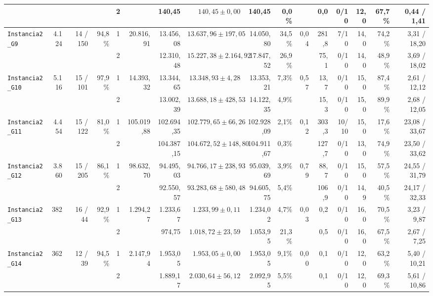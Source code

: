 {\begin{longtable}{lrrrcrrrrrrrrrrr}
& & & & 2 &  & 140,45 & $140,45 \pm 0,00$ & 140,45 & 0,0\% &  & 0,0 & 0/10 & 12,0 & 67,7\% & 0,44 / 1,41 \\
\midrule
\multirow{2}{*}{\texttt{Instancia2\_G9}} & \multirow{2}{*}{4.124} & \multirow{2}{*}{14 / 150} & \multirow{2}{*}{94,8\%} & 1 & \multirow{2}{*}{20.816,91} & 13.456,08 & $13.637,96 \pm 197,05$ & 14.050,80 & 34,5\% & \multirow{2}{*}{0,04} & 281,8 & 7/10 & 14,0 & 74,2\% & 3,31 / 18,20 \\
& & & & 2 &  & 12.310,48 & $15.227,38 \pm 2.164,92$ & 17.847,52 & 26,9\% &  & 75,1 & 0/10 & 14,0 & 48,9\% & 3,69 / 18,02 \\
\midrule
\multirow{2}{*}{\texttt{Instancia2\_G10}} & \multirow{2}{*}{5.116} & \multirow{2}{*}{15 / 101} & \multirow{2}{*}{97,9\%} & 1 & \multirow{2}{*}{14.393,32} & 13.344,65 & $13.348,93 \pm 4,28$ & 13.353,21 & 7,3\% & \multirow{2}{*}{0,57} & 13,7 & 0/10 & 15,0 & 87,4\% & 2,61 / 12,12 \\
& & & & 2 &  & 13.002,39 & $13.688,18 \pm 428,53$ & 14.122,35 & 4,9\% &  & 15,3 & 0/10 & 15,0 & 89,9\% & 2,68 / 12,05 \\
\midrule
\multirow{2}{*}{\texttt{Instancia2\_G11}} & \multirow{2}{*}{4.454} & \multirow{2}{*}{15 / 122} & \multirow{2}{*}{81,0\%} & 1 & \multirow{2}{*}{105.019,88} & 102.694,35 & $102.779,65 \pm 66,26$ & 102.928,09 & 2,1\% & \multirow{2}{*}{0,12} & 303,3 & 10/10 & 15,0 & 17,6\% & 23,08 / 33,67 \\
& & & & 2 &  & 104.387,15 & $104.672,52 \pm 148,80$ & 104.911,67 & 0,3\% &  & 127,7 & 0/10 & 13,0 & 74,9\% & 23,50 / 33,62 \\
\midrule
\multirow{2}{*}{\texttt{Instancia2\_G12}} & \multirow{2}{*}{3.860} & \multirow{2}{*}{15 / 205} & \multirow{2}{*}{86,1\%} & 1 & \multirow{2}{*}{98.632,70} & 94.495,03 & $94.766,17 \pm 238,93$ & 95.039,69 & 3,9\% & \multirow{2}{*}{0,79} & 88,7 & 0/10 & 15,0 & 57,5\% & 24,55 / 31,79 \\
& & & & 2 &  & 92.550,57 & $93.283,68 \pm 580,48$ & 94.605,75 & 5,4\% &  & 106,9 & 0/10 & 14,9 & 40,5\% & 24,17 / 32,33 \\
\midrule
\multirow{2}{*}{\texttt{Instancia2\_G13}} & \multirow{2}{*}{382} & \multirow{2}{*}{16 / 44} & \multirow{2}{*}{92,9\%} & 1 & \multirow{2}{*}{1.294,27} & 1.233,67 & $1.233,99 \pm 0,11$ & 1.234,02 & 4,7\% & \multirow{2}{*}{0,03} & 0,2 & 0/10 & 16,0 & 70,5\% & 3,23 / 9,87 \\
& & & & 2 &  & 974,75 & $1.018,72 \pm 23,59$ & 1.053,95 & 21,3\% &  & 0,5 & 0/10 & 16,0 & 67,5\% & 2,67 / 7,25 \\
\midrule
\multirow{2}{*}{\texttt{Instancia2\_G14}} & \multirow{2}{*}{362} & \multirow{2}{*}{12 / 39} & \multirow{2}{*}{94,5\%} & 1 & \multirow{2}{*}{2.147,94} & 1.953,05 & $1.953,05 \pm 0,00$ & 1.953,05 & 9,1\% & \multirow{2}{*}{0,00} & 0,1 & 0/10 & 12,0 & 63,2\% & 5,40 / 10,21 \\
& & & & 2 &  & 1.889,17 & $2.030,64 \pm 56,12$ & 2.092,95 & 5,5\% &  & 0,1 & 0/10 & 12,0 & 69,3\% & 5,61 / 10,86 \\
\end{longtable}
}
